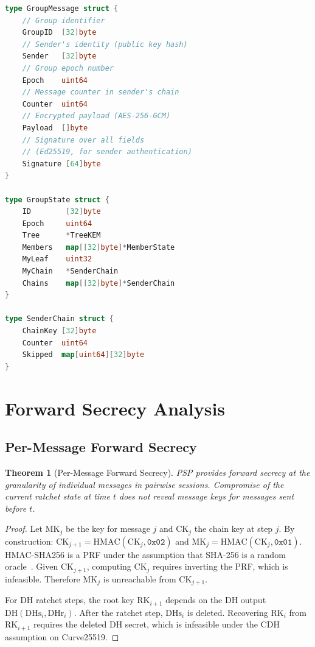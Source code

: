 \documentclass[11pt,a4paper]{article}
\newtheorem{theorem}{Theorem}[section]
\begin{document}
\begin{lstlisting}[language=Go,caption={Group Message Structure}]
type GroupMessage struct {
    // Group identifier
    GroupID  [32]byte
    // Sender's identity (public key hash)
    Sender   [32]byte
    // Group epoch number
    Epoch    uint64
    // Message counter in sender's chain
    Counter  uint64
    // Encrypted payload (AES-256-GCM)
    Payload  []byte
    // Signature over all fields
    // (Ed25519, for sender authentication)
    Signature [64]byte
}

type GroupState struct {
    ID        [32]byte
    Epoch     uint64
    Tree      *TreeKEM
    Members   map[[32]byte]*MemberState
    MyLeaf    uint32
    MyChain   *SenderChain
    Chains    map[[32]byte]*SenderChain
}

type SenderChain struct {
    ChainKey [32]byte
    Counter  uint64
    Skipped  map[uint64][32]byte
}
\end{lstlisting}

\section{Forward Secrecy Analysis}
\label{sec:forward-secrecy}

\subsection{Per-Message Forward Secrecy}

\begin{theorem}[Per-Message Forward Secrecy]
    \label{thm:per-msg-fs}
    PSP provides forward secrecy at the granularity of individual messages
    in pairwise sessions.  Compromise of the current ratchet state at time
    $t$ does not reveal message keys for messages sent before $t$.
\end{theorem}

\begin{proof}
    Let $\mathrm{MK}_j$ be the key for message $j$ and $\mathrm{CK}_j$
    the chain key at step $j$.  By construction:
    $\mathrm{CK}_{j+1} = \mathrm{HMAC}(\mathrm{CK}_j, \texttt{0x02})$
    and $\mathrm{MK}_j = \mathrm{HMAC}(\mathrm{CK}_j, \texttt{0x01})$.
    HMAC-SHA256 is a PRF under the assumption that SHA-256 is a random
    oracle~\cite{bellare1996keying}.  Given $\mathrm{CK}_{j+1}$, computing
    $\mathrm{CK}_j$ requires inverting the PRF, which is infeasible.
    Therefore $\mathrm{MK}_j$ is unreachable from $\mathrm{CK}_{j+1}$.

    For DH ratchet steps, the root key $\mathrm{RK}_{i+1}$ depends on the
    DH output $\mathrm{DH}(\mathrm{DHs}_i, \mathrm{DHr}_i)$.  After the
    ratchet step, $\mathrm{DHs}_i$ is deleted.  Recovering
    $\mathrm{RK}_i$ from $\mathrm{RK}_{i+1}$ requires the deleted DH
    secret, which is infeasible under the CDH assumption on Curve25519.
\end{proof}
\end{document}
